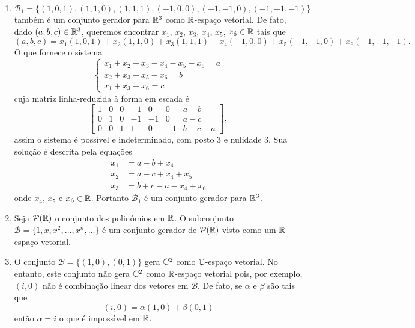 \begin{exemplo}
\begin{enumerate}
	\[
		(a, b, c) = a(1, 0, 0) + b(0, 1, 0) + c(0, 0, 1).
	\]
	Assim qualquer vetor de $\real^3$ \'e uma combina\c{c}\~ao linear dos vetores $(1, 0 , 0)$, $(0, 1 , 0)$ e $(0, 0 , 1)$. Logo o conjunto $\mathcal{B} = \{(1, 0 , 0), (0, 1 , 0), (0, 0 , 1)\}$ \'e um conjunto gerador para $\real^3$.
	\item $\mathcal{B}_1 = \{(1, 0 , 1), (1, 1 , 0), (1, 1 , 1), (-1, 0, 0), (-1, -1, 0), (-1, -1, -1)\}$ tamb\'em \'e um conjunto gerador para $\real^3$ como $\mathbb{R}$-espa\c{c}o vetorial. De fato, dado $(a, b, c) \in \mathbb{R}^3$, queremos encontrar $x_1$, $x_2$, $x_3$, $x_4$, $x_5$, $x_6 \in \mathbb{R}$ tais que
	\[
		(a, b, c) = x_1(1, 0 , 1) + x_2(1, 1 , 0) + x_3(1, 1 , 1) + x_4(-1, 0, 0) + x_5(-1, -1, 0) + x_6(-1, -1, -1).
	\]
	O que fornece o sistema
	\[
		\begin{cases}
			x_1 + x_2 + x_3 - x_4 - x_5 - x_6 = a\\
			x_2 + x_3 - x_5 - x_6 = b\\
			x_1 + x_3 - x_6 = c
		\end{cases}
	\]
	cuja matriz linha-reduzida \`a forma em escada \'e
	\[
		\begin{bmatrix}
			1 & 0 & 0 & -1 & 0 & 0 & a - b\\
			0 & 1 & 0 & -1 & -1 & 0 & a - c\\
			0 & 0 & 1 & 1 & 0 & -1 & b + c - a
		\end{bmatrix},
	\]
	assim o sistema \'e poss{\'\i}vel e indeterminado, com posto 3 e nulidade 3. Sua solu\c{c}\~ao \'e descrita pela equa\c{c}\~oes
	\begin{align*}
		x_1 &= a - b + x_4\\
		x_2 &= a - c + x_4 + x_5\\
		x_3 &= b + c - a - x_4 + x_6
	\end{align*}
	onde $x_4$, $x_5$ e $x_6 \in \mathbb{R}$. Portanto $\mathcal{B}_1$ \'e um conjunto gerador para $\real^3$.
	\item Seja $\mathcal{P}(\mathbb{R})$ o conjunto dos polin\^omios em $\mathbb{R}$. O subconjunto $\mathcal{B} = \{1, x, x^2, \dots, x^n, \dots\}$ \'e um conjunto gerador de $\mathcal{P}(\mathbb{R})$ visto como um $\mathbb{R}$-espa\c{c}o vetorial.
	\item O conjunto $\mathcal{B} = \{(1, 0), (0, 1)\}$ gera $\mathbb{C}^2$ como $\mathbb{C}$-espa\c{c}o vetorial. No entanto, este conjunto n\~ao gera $\mathbb{C}^2$ como $\mathbb{R}$-espa\c{c}o vetorial pois, por exemplo, $(i, 0)$ n\~ao \'e combina\c{c}\~ao linear dos vetores em $\mathcal{B}$. De fato, se $\alpha$ e $\beta$ s\~ao tais que
	\[
		(i, 0) = \alpha (1, 0) + \beta (0, 1)
	\]
	ent\~ao $\alpha = i$ o que \'e imposs{\'\i}vel em $\mathbb{R}$.
	\end{enumerate}
\end{exemplo}

